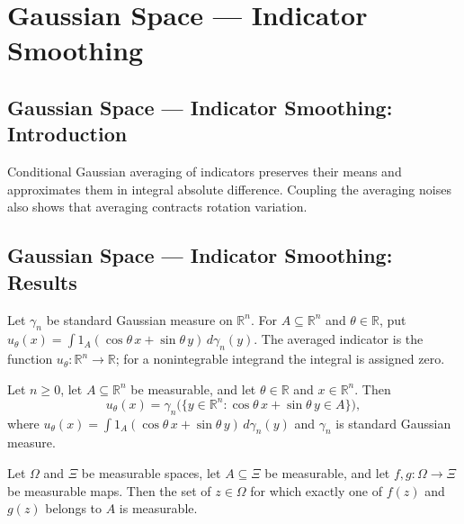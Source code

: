 \section{Gaussian Space --- Indicator Smoothing}
\subsection*{Gaussian Space --- Indicator Smoothing: Introduction}
Conditional Gaussian averaging of indicators preserves their means and approximates them in integral absolute difference. Coupling the averaging noises also shows that averaging contracts rotation variation.

\subsection*{Gaussian Space --- Indicator Smoothing: Results}

\begin{definition}
\leanok
{}
Let $\gamma_n$ be standard Gaussian measure on $\mathbb R^n$. For $A\subseteq\mathbb R^n$ and $\theta\in\mathbb R$, put $u_\theta(x)=\int1_A(\cos\theta\,x+\sin\theta\,y)\,d\gamma_n(y)$. The averaged indicator is the function $u_\theta:\mathbb R^n\to\mathbb R$; for a nonintegrable integrand the integral is assigned zero.
\end{definition}

\begin{lemma}
\leanok
{}
Let $n\ge0$, let $A\subseteq\mathbb R^n$ be measurable, and let $\theta\in\mathbb R$ and
$x\in\mathbb R^n$. Then
\[
u_\theta(x)=\gamma_n\bigl(\{y\in\mathbb R^n:\cos\theta\,x+\sin\theta\,y\in A\}\bigr),
\]
where $u_\theta(x)=\int 1_A(\cos\theta\,x+\sin\theta\,y)\,d\gamma_n(y)$ and $\gamma_n$
is standard Gaussian measure.
\end{lemma}

\begin{lemma}
\leanok
{}
Let $\Omega$ and $\Xi$ be measurable spaces, let $A\subseteq\Xi$ be measurable, and let
$f,g:\Omega\to\Xi$ be measurable maps. Then the set of $z\in\Omega$ for which exactly
one of $f(z)$ and $g(z)$ belongs to $A$ is measurable.
\end{lemma}

